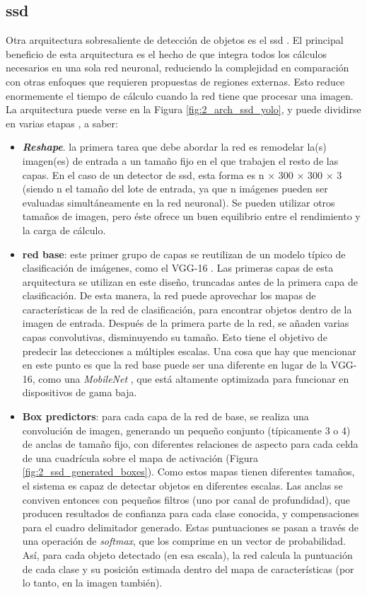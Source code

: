 \subsection*{\acrfull{ssd}}
Otra arquitectura sobresaliente de detección de objetos es el \acrfull{ssd} \cite{ssd}. El principal beneficio de esta arquitectura es el hecho de que integra todos los cálculos necesarios en una sola red neuronal, reduciendo la complejidad en comparación con otras enfoques que requieren propuestas de regiones externas. Esto reduce enormemente el tiempo de cálculo cuando la red tiene que procesar una imagen. La arquitectura puede verse en la Figura \ref{fig:2_arch_ssd_yolo}, y puede dividirse en varias etapas \cite{nacho_tfg}, a saber:
\begin{itemize}
  \item \textbf{\textit{Reshape}}. la primera tarea que debe abordar la red es remodelar la(s) imagen(es) de entrada a un tamaño fijo en el que trabajen el resto de las capas. En el caso de un detector de \acrshort{ssd}, esta forma es n × 300 × 300 × 3 (siendo n el tamaño del lote de entrada, ya que n imágenes pueden ser evaluadas simultáneamente en la red neuronal). Se pueden utilizar otros tamaños de imagen, pero éste ofrece un buen equilibrio entre el rendimiento y la carga de cálculo.
  
  \item \textbf{red base}:  este primer grupo de capas se reutilizan de un modelo típico de clasificación de imágenes, como el VGG-16 \cite{vgg16}. Las primeras capas de esta arquitectura se utilizan en este diseño, truncadas antes de la primera capa de clasificación. De esta manera, la red puede aprovechar los mapas de características de la red de clasificación, para encontrar objetos dentro de la imagen de entrada. Después de la primera parte de la red, se añaden varias capas convolutivas, disminuyendo su tamaño. Esto tiene el objetivo de predecir las detecciones a múltiples escalas. Una cosa que hay que mencionar en este punto es que la red base puede ser una diferente en lugar de la VGG-16, como una \textit{MobileNet} \cite{mobilenet}, que está altamente optimizada para funcionar en dispositivos de gama baja.
  
  \item \textbf{Box predictors}: para cada capa de la red de base, se realiza una convolución de imagen, generando un pequeño conjunto (típicamente 3 o 4) de anclas de tamaño fijo, con diferentes relaciones de aspecto para cada celda de una cuadrícula sobre el mapa de activación (Figura \ref{fig:2_ssd_generated_boxes}). Como estos mapas tienen diferentes tamaños, el sistema es capaz de detectar objetos en diferentes escalas. Las anclas se conviven entonces con pequeños filtros (uno por canal de profundidad), que producen resultados de confianza para cada clase conocida, y compensaciones para el cuadro delimitador generado. Estas puntuaciones se pasan a través de una operación de \textit{softmax}, que los comprime en un vector de probabilidad. Así, para cada objeto detectado (en esa escala), la red calcula la puntuación de cada clase y su posición estimada dentro del mapa de características (por lo tanto, en la imagen también).
  

\end{itemize}
